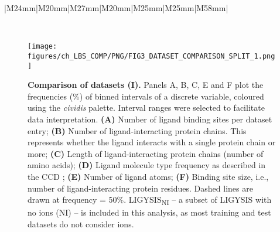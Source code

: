 \begin{landscape}
\begin{longtable}{|M{24mm}|M{20mm}|M{27mm}|M{20mm}|M{25mm}|M{25mm}|M{58mm}|}
\caption[Datasets summary statistics]{\textbf{Datasets summary statistics.} \# Structures, \# Sites and \# Ligands represent the number of PDB structures, ligand sites and total number of ligands for each dataset. For LIGYSIS and LIGYSIS\textsubscript{NI}, 3448 and 2775, are the number of structural segments, each represented by a single chain. For each segment, biologically relevant ligands across structures were considered: \textit{N} = 23,321 (LIGYSIS) and \textit{N} = 19,012 (LIGYSIS\textsubscript{NI}). The number of ligands is not equal to the number of sites for LIGYSIS and LIGYSIS\textsubscript{NI}, as ligands from multiple structures of the same protein are aggregated into unique sites. Overlap is the number of LIGYSIS binding sites represented by at least one protein-ligand complex for a given dataset. Percentage relative to LIGYSIS also reported. Methods represents the ligand site predictors that use these datasets for training or test. For \# Structures, \# Sites and \# Ligands, highest values are coloured in bold blue font and lowest in orange. This is the other way around for Overlap (\%).}
\label{tab:datasets_comp}\\
\end{longtable}
\end{landscape}

\begin{figure}[htb!]
    \centering
    \texttt{[image: figures/ch\_LBS\_COMP/PNG/FIG3\_DATASET\_COMPARISON\_SPLIT\_1.png]}
    \caption[Comparison of datasets (I)]{\textbf{Comparison of datasets (I).} Panels A, B, C, E and F plot the frequencies (\%) of binned intervals of a discrete variable, coloured using the \textit{cividis} palette. Interval ranges were selected to facilitate data interpretation. \textbf{(A)} Number of ligand binding sites per dataset entry; \textbf{(B)} Number of ligand-interacting protein chains. This represents whether the ligand interacts with a single protein chain or more; \textbf{(C)} Length of ligand-interacting protein chains (number of amino acids); \textbf{(D)} Ligand molecule type frequency as described in the CCD \cite{WESTBROOK_2015_CCD}; \textbf{(E)} Number of ligand atoms; \textbf{(F)} Binding site size, i.e., number of ligand-interacting protein residues. Dashed lines are drawn at frequency = 50\%. LIGYSIS\textsubscript{NI} -- a subset of LIGYSIS with no ions (NI) -- is included in this analysis, as most training and test datasets do not consider ions.}
    \label{fig:dataset_comp_1}
\end{figure}

